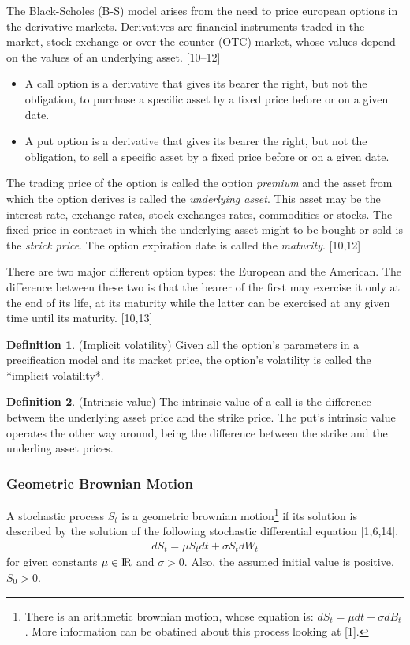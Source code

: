 \documentclass[12pt,twoside]{reedthesis}
\theoremstyle{definition}
\newtheorem{definition}{Definition}[section]
\theoremstyle{definition}
\theoremstyle{remark}
\begin{document}
  The Black-Scholes (B-S) model arises from the need to price european
  options in the derivative markets. Derivatives are financial instruments
  traded in the market, stock exchange or over-the-counter (OTC) market,
  whose values depend on the values of an underlying asset. {[}10--12{]}
  \begin{itemize}
  \item
    A call option is a derivative that gives its bearer the right, but not
    the obligation, to purchase a specific asset by a fixed price before
    or on a given date.
  \item
    A put option is a derivative that gives its bearer the right, but not
    the obligation, to sell a specific asset by a fixed price before or on
    a given date.
  \end{itemize}
  The trading price of the option is called the option \emph{premium} and
  the asset from which the option derives is called the \emph{underlying
  asset}. This asset may be the interest rate, exchange rates, stock
  exchanges rates, commodities or stocks. The fixed price in contract in
  which the underlying asset might to be bought or sold is the
  \emph{strick price}. The option expiration date is called the
  \emph{maturity}. {[}10,12{]}
  
  There are two major different option types: the European and the
  American. The difference between these two is that the bearer of the
  first may exercise it only at the end of its life, at its maturity while
  the latter can be exercised at any given time until its maturity.
  {[}10,13{]}
  \begin{definition}{(Implicit volatility)} 
  Given all the option's parameters in a precification model and its market price, the option's volatility is called the *implicit volatility*.
  \end{definition}
  \begin{definition}{(Intrinsic value)} 
  The intrinsic value of a call is the difference between the underlying asset price and the strike price. The put's intrinsic value operates the other way around, being the difference between the strike and the underling asset prices.
  \end{definition}
  \subsubsection{Geometric Brownian Motion}\label{gbm}
  
  A stochastic process \(S_t\) is a geometric brownian motion\footnote{There
    is an arithmetic brownian motion, whose equation is:
    \(dS_t = \mu dt + \sigma dB_t\). More information can be obatined
    about this process looking at {[}1{]}.} if its solution is described
  by the solution of the following stochastic differential equation
  {[}1,6,14{]}.
  \begin{align}
  dS_t = \mu S_t dt + \sigma S_t dW_t
  \end{align}
  \noindent
  for given constants \(\mu \in {\rm I\!R}\) and \(\sigma > 0\). Also, the
  assumed initial value is positive, \(S_0 >0\).
  
\end{document}
